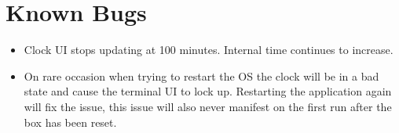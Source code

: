 \documentclass[pdftex,10pt,a4paper]{article}
\begin{document}
\section*{Known Bugs}

\begin{itemize}
\item Clock UI stops updating at 100 minutes. Internal time continues to
	increase.
\item On rare occasion when trying to restart the OS the clock will be in a
	bad state and cause the terminal UI to lock up. Restarting the
	application again will fix the issue, this issue will also never
	manifest on the first run after the box has been reset.
\end{itemize}
\end{document}
